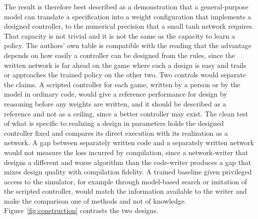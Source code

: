 \documentclass[11pt]{article}
\begin{document}
The result is therefore best described as a demonstration that a general-purpose model can translate a specification into a weight configuration that implements a designed controller, to the numerical precision that a small tanh network requires. That capacity is not trivial and it is not the same as the capacity to learn a policy. The authors' own table is compatible with the reading that the advantage depends on how easily a controller can be designed from the rules, since the written network is far ahead on the game where such a design is easy and trails or approaches the trained policy on the other two. Two controls would separate the claims. A scripted controller for each game, written by a person or by the model in ordinary code, would give a reference performance for design by reasoning before any weights are written, and it should be described as a reference and not as a ceiling, since a better controller may exist. The clean test of what is specific to realizing a design in parameters holds the designed controller fixed and compares its direct execution with its realization as a network. A gap between separately written code and a separately written network would not measure the loss incurred by compilation, since a network-writer that designs a different and worse algorithm than the code-writer produces a gap that mixes design quality with compilation fidelity. A trained baseline given privileged access to the simulator, for example through model-based search or imitation of the scripted controller, would match the information available to the writer and make the comparison one of methods and not of knowledge. Figure~\ref{fig:construction} contrasts the two designs.
\end{document}
